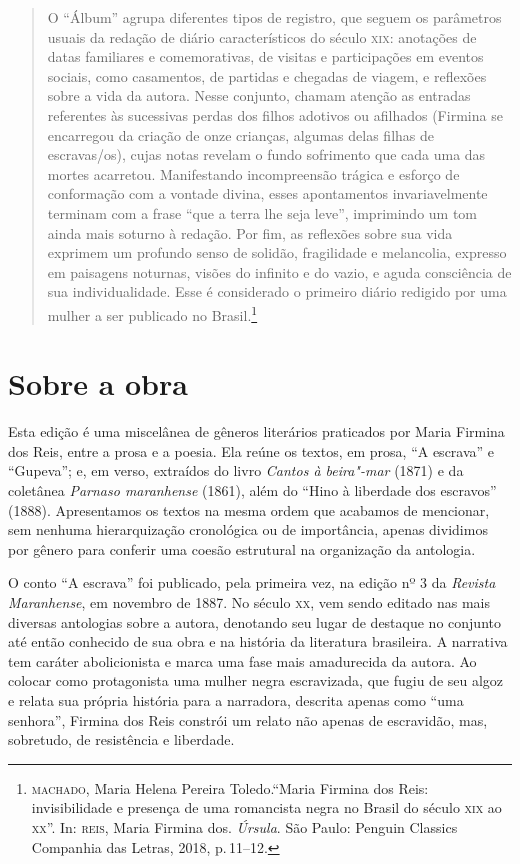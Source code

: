 \begin{quote}
O ``Álbum'' agrupa diferentes tipos de registro, que seguem os parâmetros usuais da redação de diário característicos do século \textsc{xix}: anotações de datas familiares e comemorativas, de visitas e participações em eventos sociais, como casamentos, de partidas e chegadas de viagem, e reflexões sobre a vida da autora.
Nesse conjunto, chamam atenção as entradas referentes às sucessivas perdas dos filhos adotivos ou afilhados (Firmina se encarregou da criação de onze crianças, algumas delas filhas de escravas/os), cujas notas revelam o fundo sofrimento que cada uma das mortes acarretou.
Manifestando incompreensão trágica e esforço de conformação com a vontade divina, esses apontamentos invariavelmente terminam com a frase ``que a terra lhe seja leve'', imprimindo um tom ainda mais soturno à redação. Por fim, as reflexões sobre sua vida exprimem um profundo senso de solidão, fragilidade e melancolia, expresso em paisagens noturnas, visões do infinito e do vazio, e aguda consciência de sua individualidade. Esse é considerado o primeiro diário redigido por uma mulher a ser publicado no Brasil.\footnote{\textsc{machado}, Maria Helena Pereira Toledo.``Maria Firmina dos Reis: invisibilidade e presença de uma romancista negra no Brasil do século \textsc{xix} ao \textsc{xx}''. In: \textsc{reis}, Maria Firmina dos. \textit{Úrsula}. São Paulo: Penguin Classics Companhia das Letras, 2018, p.\,11--12.}
\end{quote}

\section{Sobre a obra}

Esta edição é uma miscelânea de gêneros literários praticados por Maria
Firmina dos
Reis, entre a prosa e a poesia. Ela reúne os textos, em prosa, ``A
escrava'' e ``Gupeva''; e, em verso, extraídos do livro \emph{Cantos à
beira"-mar} (1871) e da coletânea \emph{Parnaso maranhense} (1861), além
do ``Hino à liberdade dos escravos'' (1888). Apresentamos os textos na
mesma ordem que acabamos de mencionar, sem nenhuma hierarquização
cronológica ou de importância, apenas dividimos por gênero para conferir
uma coesão estrutural na organização da antologia.

O conto ``A escrava'' foi publicado, pela primeira vez, na edição nº 3
da \emph{Revista Maranhense}, em novembro de 1887. No século \textsc{xx}, vem
sendo editado nas mais diversas antologias sobre a autora, denotando seu
lugar de destaque no conjunto até então conhecido de sua obra e na
história da literatura brasileira. A narrativa tem caráter abolicionista
e marca uma fase mais amadurecida da autora. Ao colocar como
protagonista uma mulher negra escravizada, que fugiu de seu algoz e
relata sua própria história para a narradora, descrita apenas como ``uma
senhora'', Firmina dos Reis constrói um relato não apenas de escravidão,
mas, sobretudo, de resistência e liberdade.

